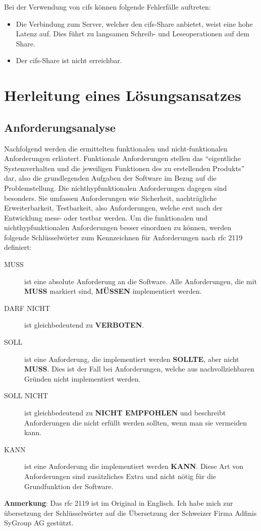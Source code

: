 \documentclass[titlepage]{report}
\begin{document}
Bei der Verwendung von \gls{cifs} können folgende Fehlerfälle auftreten:
\begin{itemize}
    \item Die Verbindung zum Server, welcher den \gls{cifs}\hyp{}Share
          anbietet, weist eine hohe Latenz auf. Dies führt zu langsamen
          Schreib\hyp{} und Leseoperationen auf dem Share.
    \item Der \gls{cifs}\hyp{}Share ist nicht erreichbar.
\end{itemize}
\chapter*{Herleitung eines Lösungsansatzes}
\section*{Anforderungsanalyse}
Nachfolgend werden die ermittelten funktionalen und nicht\hyp{}funktionalen
Anforderungen erläutert. Funktionale Anforderungen stellen das
``eigentliche Systemverhalten und die jeweiligen Funktionen des zu
erstellenden Produkts''\cite[S. 20]{BPSE} dar, also die grundlegenden
Aufgaben der Software im Bezug auf die Problemstellung. Die
nichthyp{}funktionalen Anforderungen dagegen sind besonders. Sie umfassen
Anforderungen wie Sicherheit, nachträgliche Erweiterbarkeit,
Testbarkeit, also Anforderungen, welche erst nach der Entwicklung
mess\hyp{} oder testbar werden\cite[S. 292]{SNFA}. Um die funktionalen
und nichthyp{}funktionalen Anforderungen besser einordnen zu können, werden
folgende Schlüsselwörter zum Kennzeichnen für Anforderungen nach
\gls{rfc} 2119\cite{RFC2119} definiert:
\begin{description}
    \item[MUSS] ist eine absolute Anforderung an die Software. Alle
        Anforderungen, die mit \textbf{MUSS} markiert sind,
        \textbf{MÜSSEN} implementiert werden.
    \item[DARF NICHT] ist gleichbedeutend zu \textbf{VERBOTEN}.
    \item[SOLL] ist eine Anforderung, die implementiert werden
        \textbf{SOLLTE}, aber nicht \textbf{MUSS}. Dies ist der Fall bei
        Anforderungen, welche aus nachvollziehbaren Gründen nicht
        implementiert werden.
    \item[SOLL NICHT] ist gleichbedeutend zu \textbf{NICHT EMPFOHLEN}
        und beschreibt Anforderungen die nicht erfüllt werden sollten,
        wenn man sie vermeiden kann.
    \item[KANN] ist eine Anforderung die implementiert werden
        \textbf{KANN}. Diese Art von Anforderungen sind
        zusätzliches Extra und nicht nötig für die Grundfunktion der
        Software.
\end{description}
\textbf{Anmerkung}: Das \gls{rfc} 2119 ist im Original in Englisch. Ich
habe mich zur übersetzung der Schlüsselwörter auf die Übersetzung der
Schweizer Firma Adfinis SyGroup AG gestützt\cite{RFC2119DE}.
\end{document}
